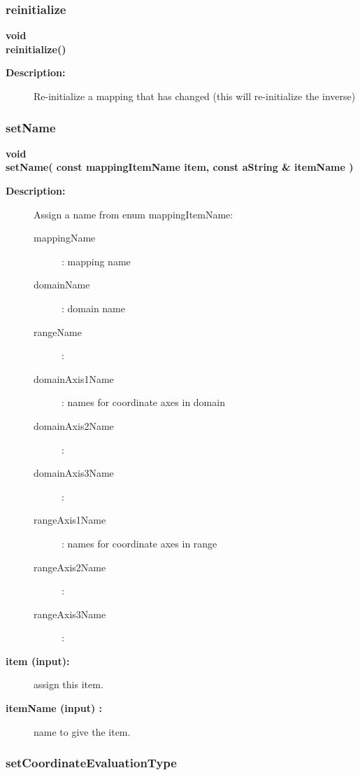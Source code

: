 \subsubsection{reinitialize}
 
\begin{flushleft} \textbf{%
void  \\ 
\settowidth{\MappingIncludeArgIndent}{reinitialize(}%
reinitialize()
}\end{flushleft}
\begin{description}
\item[{\bf Description:}] 
   Re-initialize a mapping that has changed (this will re-initialize the inverse)
\end{description}
\subsubsection{setName}
 
\begin{flushleft} \textbf{%
void  \\ 
\settowidth{\MappingIncludeArgIndent}{setName(}%
setName( const mappingItemName item, const aString \& itemName )
}\end{flushleft}
\begin{description}
\item[{\bf Description:}] 
    Assign a name from enum mappingItemName:
  \begin{description}
    \item[mappingName] : mapping name
    \item[domainName] : domain name
    \item[rangeName] :
    \item[domainAxis1Name] : names for coordinate axes in domain
    \item[domainAxis2Name] : 
    \item[domainAxis3Name] : 
    \item[rangeAxis1Name] : names for coordinate axes in range
    \item[rangeAxis2Name] : 
    \item[rangeAxis3Name] :
  \end{description}
\item[{\bf item (input):}]  assign this item.
\item[{\bf itemName (input) :}]  name to give the item.
\end{description}
\subsubsection{setCoordinateEvaluationType}
 
